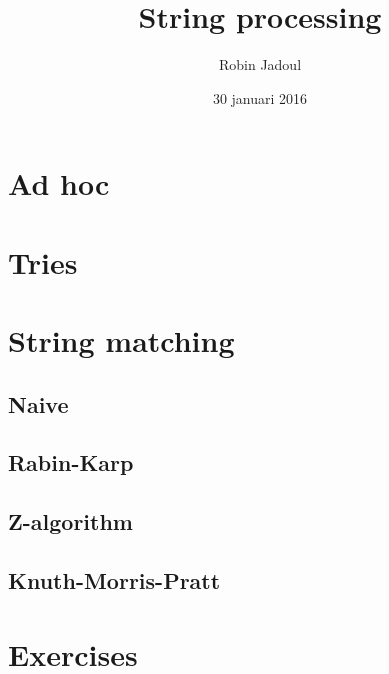 \documentclass{beamer}
\title{String processing}
\author{Robin Jadoul}
\date{30 januari 2016}
\institute
{
    \texttt{[image: img/Icon.png]}
}
\begin{document}
\frame{\titlepage}

\section[Ad hoc]{Ad hoc}


\section[Tries]{Tries}


\section[String matching]{String matching}
\subsection[Naive]{Naive}

\subsection[Rabin-Karp]{Rabin-Karp}

\subsection[Z-algorithm]{Z-algorithm}

\subsection[Knuth-Morris-Pratt]{Knuth-Morris-Pratt}


\section[Exercises]{Exercises}

\end{document}
